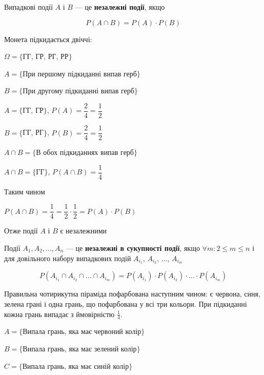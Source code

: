 \begin{definition}
    Випадкові події $A$ і $B$ --- це \textbf{незалежні події}, якщо

    $$P(A \cap B) = P(A) \cdot P(B)$$   
\end{definition}

\begin{example}
    Монета підкидається двіччі:

    $\Omega = \{$ГГ, ГР, РГ, РР$\}$

    $A = \{$При першому підкиданні випав герб$\}$
    
    $B = \{$При другому підкиданні випав герб$\}$

    $A = \{$ГГ, ГР$\}$, $P(A) = \dfrac{2}{4} = \dfrac{1}{2}$
    
    $B = \{$ГГ, РГ$\}$, $P(B) = \dfrac{2}{4} = \dfrac{1}{2}$
    
    $A \cap B = \{$В обох підкиданнях випав герб$\}$

    $A \cap B = \{$ГГ$\}$, $P(A \cap B) = \dfrac{1}{4}$
        
    Таким чином

    $P(A \cap B)
    = \dfrac{1}{4}
    = \dfrac{1}{2} \cdot \dfrac{1}{2}
    = P(A) \cdot P(B)$
    
    Отже події $A$ і $B$ є незалежними
\end{example}

\begin{definition}
    Події $A_1, A_2, ..., A_n$ --- це
    \textbf{незалежні в сукупності події}, якщо
    $\forall m: 2 \leqslant m \leqslant n$ і для довільного
    набору випадкових подій $A_{i_1}$, $A_{i_2}$, ..., $A_{i_m}$
    
    $$P(A_{i_1} \cap A_{i_2} \cap ... \cap A_{i_m})
    = P(A_{i_1}) \cdot P(A_{i_2}) \cdot ... \cdot P(A_{i_m})$$
\end{definition}

\begin{example}
    Правильна чотирикутна піраміда пофарбована наступним чином:
    є червона, синя, зелена грані і одна грань, що пофарбована
    у всі три кольори. При підкиданні кожна грань випадає з
    ймовірністю $\frac{1}{4}$.
\end{example}

$A = \{$Випала грань, яка має червоний колір$\}$

$B = \{$Випала грань, яка має зелений колір$\}$

$C = \{$Випала грань, яка має синій колір$\}$

